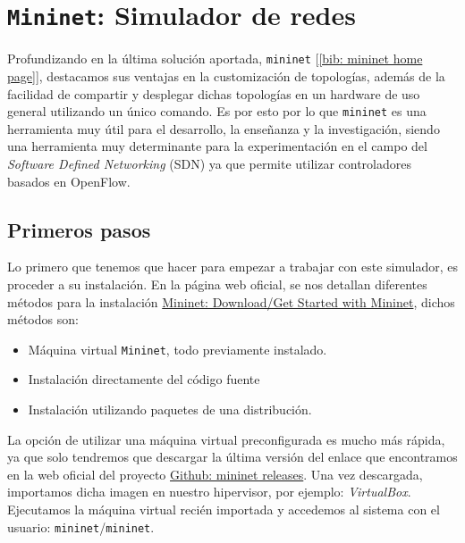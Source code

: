 \documentclass[a4paper, oneside, 12pt]{book}
\begin{document}
	\vspace{10px}
	
	\section{\texttt{Mininet}: Simulador de redes}
	
	\noindent Profundizando en la última solución aportada, \texttt{mininet} [\ref{bib: mininet home page}], destacamos sus ventajas en la customización de topologías, además de la facilidad de compartir y desplegar dichas topologías en un hardware de uso general utilizando un único comando. Es por esto por lo que \texttt{mininet} es una herramienta muy útil para el desarrollo, la enseñanza y la investigación, siendo una herramienta muy determinante para la experimentación en el campo del \textit{Software Defined Networking} (SDN) ya que permite utilizar controladores basados en OpenFlow.
	
	\subsection{Primeros pasos}
	\noindent Lo primero que tenemos que hacer para empezar a trabajar con este simulador, es proceder a su instalación. En la página web oficial, se nos detallan diferentes métodos para la instalación \href{http://mininet.org/download/}{Mininet: Download/Get Started with Mininet}, dichos métodos son: 
	
	\begin{itemize}
		\item Máquina virtual \texttt{Mininet}, todo previamente instalado.
		\item Instalación directamente del código fuente
		\item Instalación utilizando paquetes de una distribución.
	\end{itemize}


	\noindent La opción de utilizar una máquina virtual preconfigurada es mucho más rápida, ya que solo tendremos que descargar la última versión del enlace que encontramos en la web oficial del proyecto \href{https://github.com/mininet/mininet/releases/}{Github: mininet releases}. Una vez descargada, importamos dicha imagen en nuestro hipervisor, por ejemplo: \textit{VirtualBox}. Ejecutamos la máquina virtual recién importada y accedemos al sistema con el usuario: \texttt{mininet}/\texttt{mininet}. \\
	
\end{document}
